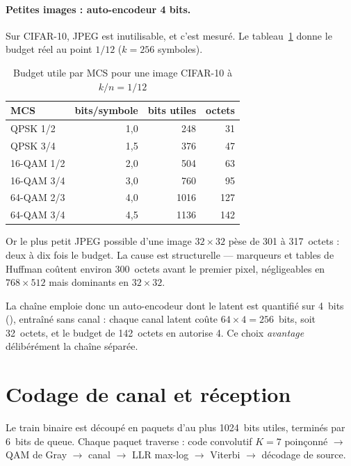 \paragraph{Petites images : auto-encodeur 4 bits.} Sur CIFAR-10, JPEG est inutilisable, et c'est mesuré. Le
tableau~\ref{tab:budget_cifar} donne le budget réel au point $1/12$ ($k = \num{256}$ symboles).

\begin{table}[H]
\centering
\caption{Budget utile par MCS pour une image CIFAR-10 à $k/n = 1/12$}
\label{tab:budget_cifar}
\small
\begin{tabular}{@{}lrrr@{}}
\toprule
\textbf{MCS} & \textbf{bits/symbole} & \textbf{bits utiles} & \textbf{octets} \\
\midrule
QPSK 1/2   & 1,0 & 248  & 31  \\
QPSK 3/4   & 1,5 & 376  & 47  \\
16-QAM 1/2 & 2,0 & 504  & 63  \\
16-QAM 3/4 & 3,0 & 760  & 95  \\
64-QAM 2/3 & 4,0 & 1016 & 127 \\
64-QAM 3/4 & 4,5 & 1136 & 142 \\
\bottomrule
\end{tabular}
\end{table}

Or le plus petit JPEG possible d'une image $32\times32$ pèse de \num{301} à \num{317}~octets : deux à dix fois
le budget. La cause est structurelle — marqueurs et tables de Huffman coûtent environ \num{300}~octets avant
le premier pixel, négligeables en $768\times512$ mais dominants en $32\times32$.

La chaîne emploie donc un auto-encodeur dont le latent est quantifié sur 4~bits (),
entraîné sans canal : chaque canal latent coûte $64\times4 = \num{256}$~bits, soit 32~octets, et le budget de
142~octets en autorise 4. Ce choix \emph{avantage} délibérément la chaîne séparée.

\section{Codage de canal et réception}
\label{sec:canal_num}

Le train binaire est découpé en paquets d'au plus \num{1024}~bits utiles, terminés par 6~bits de queue. Chaque
paquet traverse : code convolutif $K=7$ poinçonné $\rightarrow$ QAM de Gray $\rightarrow$ canal $\rightarrow$
LLR max-log $\rightarrow$ Viterbi $\rightarrow$ décodage de source.

